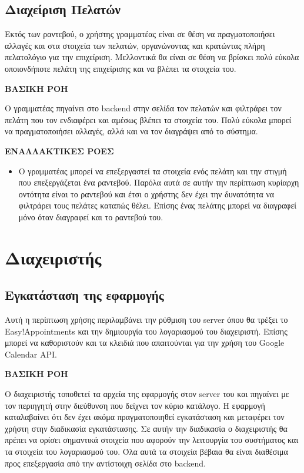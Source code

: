 \subsection{Διαχείριση Πελατών}
Εκτός των ραντεβού, ο χρήστης γραμματέας είναι σε θέση να πραγματοποιήσει αλλαγές και στα στοιχεία των πελατών, οργανώνοντας και κρατώντας πλήρη πελατολόγιο για την επιχείριση. Μελλοντικά θα είναι σε θέση να βρίσκει πολύ εύκολα οποιονδήποτε πελάτη της επιχείρισης και να βλέπει τα στοιχεία του.

\textbf{ΒΑΣΙΚΗ ΡΟΗ}

Ο γραμματέας πηγαίνει στο backend στην σελίδα τον πελατών και φιλτράρει τον πελάτη που τον ενδιαφέρει και αμέσως βλέπει τα στοιχεία του. Πολύ εύκολα μπορεί να πραγματοποιήσει αλλαγές, αλλά και να τον διαγράψει από το σύστημα. 

\textbf{ΕΝΑΛΛΑΚΤΙΚΕΣ ΡΟΕΣ}

\begin{itemize}
\item Ο γραμματέας μπορεί να επεξεργαστεί τα στοιχεία ενός πελάτη και την στιγμή που επεξεργάζεται ένα ραντεβού. Παρόλα αυτά σε αυτήν την περίπτωση κυρίαρχη οντότητα είναι το ραντεβού και έτσι ο χρήστης δεν έχει την δυνατότητα να φιλτράρει τους πελάτες καταπώς θέλει. Επίσης ένας πελάτης μπορεί να διαγραφεί μόνο όταν διαγραφεί και το ραντεβού του.
\end{itemize}

\section{Διαχειριστής}
\subsection{Εγκατάσταση της εφαρμογής}
Αυτή η περίπτωση χρήσης περιλαμβάνει την ρύθμιση του server όπου θα τρέξει το Easy!Appointments και την δημιουργία του λογαριασμού του διαχειριστή. Επίσης μπορεί να καθοριστούν και τα κλειδιά που απαιτούνται για την χρήση του Google Calendar API.

\textbf{ΒΑΣΙΚΗ ΡΟΗ} 

Ο διαχειριστής τοποθετεί τα αρχεία της εφαρμογής στον server του και πηγαίνει με τον περιηγητή στην διεύθυνση που δείχνει τον κύριο κατάλογο. Η εφαρμογή καταλαβαίνει ότι δεν έχει ακόμα πραγματοποιηθεί εγκατάσταση και μεταφέρει τον χρήστη στην διαδικασία εγκατάστασης. Σε αυτήν την διαδικασία ο διαχειριστής θα πρέπει να ορίσει σημαντικά στοιχεία που αφορούν την λειτουργία του συστήματος και τα στοιχεία του λογαριασμού του. Όλα αυτά τα στοιχεία βέβαια θα είναι διαθέσιμα προς επεξεργασία από την αντίστοιχη σελίδα στο backend.

